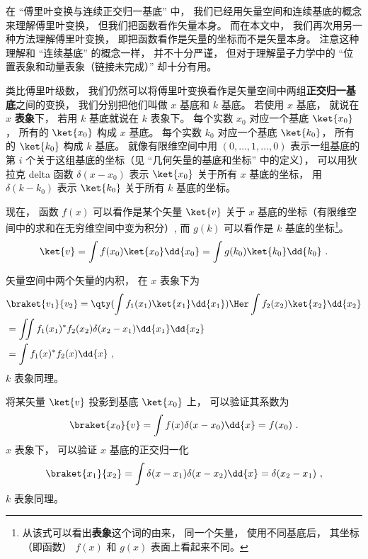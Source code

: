 
\begin{issues}
\issueTODO
\end{issues}


在 “傅里叶变换与连续正交归一基底” 中， 我们已经用矢量空间和连续基底的概念来理解傅里叶变换， 但我们把函数看作矢量本身。 而在本文中， 我们再次用另一种方法理解傅里叶变换， 即把函数看作是矢量的坐标而不是矢量本身。 注意这种理解和 “连续基底” 的概念一样， 并不十分严谨， 但对于理解量子力学中的 “位置表象和动量表象（链接未完成）” 却十分有用。

类比傅里叶级数， 我们仍然可以将傅里叶变换看作是矢量空间中两组\textbf{正交归一基底}之间的变换， 我们分别把他们叫做 $x$ 基底和 $k$ 基底。 若使用 $x$ 基底， 就说在 $x$ \textbf{表象}下， 若用 $k$ 基底就说在 $k$ 表象下。 每个实数 $x_0$ 对应一个基底 $\ket {x_0}$， 所有的 $\ket{x_0}$ 构成 $x$ 基底。 每个实数 $k_0$ 对应一个基底 $\ket {k_0}$， 所有的 $\ket {k_0}$ 构成 $k$ 基底。 就像有限维空间中用 $(0, \dots , 1, \dots , 0)$ 表示一组基底的第 $i$ 个关于这组基底的坐标（见 “几何矢量的基底和坐标” 中的定义）， 可以用狄拉克 delta 函数 $\delta (x - x_0)$ 表示 $\ket {x_0}$ 关于所有 $x$ 基底的坐标， 用 $\delta (k - k_0)$ 表示 $\ket {k_0}$ 关于所有 $k$ 基底的坐标。

现在， 函数 $f(x)$ 可以看作是某个矢量 $\ket{v}$ 关于 $x$ 基底的坐标（有限维空间中的求和在无穷维空间中变为积分）, 而 $g(k)$ 可以看作是 $k$ 基底的坐标\footnote{从该式可以看出\textbf{表象}这个词的由来， 同一个矢量， 使用不同基底后， 其坐标（即函数） $f(x)$ 和 $g(x)$ 表面上看起来不同。}。
\begin{equation}
\ket{v} = \int f(x_0) \ket {x_0} \dd{x_0} = \int g(k_0) \ket {k_0} \dd{k_0}~.
\end{equation}

矢量空间中两个矢量的内积， 在 $x$ 表象下为
\begin{equation}
\begin{aligned}
&\braket{v_1}{v_2} = \qty(\int f_1(x_1) \ket{x_1} \dd{x_1})\Her  \int f_2(x_2) \ket{x_2} \dd{x_2}\\
&=\iint f_1(x_1)^* f_2(x_2) \delta (x_2 - x_1) \dd{x_1}\dd{x_2}\\
&=\int f_1(x)^* f_2(x) \dd{x}~,
\end{aligned}
\end{equation}
$k$ 表象同理。

将某矢量 $\ket{v}$ 投影到基底 $\ket{x_0}$ 上， 可以验证其系数为
\begin{equation}
\braket{x_0}{v} = \int f(x) \delta (x - x_0) \dd{x} = f(x_0)~.
\end{equation}
$x$ 表象下， 可以验证 $x$ 基底的正交归一化%
\begin{equation}
\braket{x_1}{x_2} = \int \delta (x - x_1) \delta (x - x_2) \dd{x} = \delta (x_2 - x_1)~,
\end{equation}
$k$ 表象同理。

